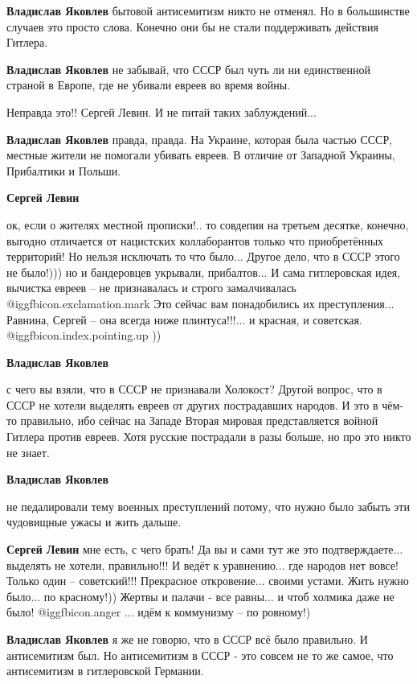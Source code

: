 \begin{itemize}
\begin{itemize}
\textbf{Владислав Яковлев} бытовой антисемитизм никто не отменял. Но в большинстве случаев это просто слова. Конечно они бы не стали поддерживать действия Гитлера.

\textbf{Владислав Яковлев} не забывай, что СССР был чуть ли ни единственной страной в Европе, где не убивали евреев во время войны.

Неправда это!! Сергей Левин. И не питай таких заблуждений...

\textbf{Владислав Яковлев} правда, правда. На Украине, которая была частью СССР, местные жители не помогали убивать евреев. В отличие от Западной Украины, Прибалтики и Польши.

\textbf{Сергей Левин} 

ок, если о жителях местной прописки!.. то совдепия на третьем десятке, конечно,
выгодно отличается от нацистских коллаборантов только что приобретённых
территорий! Но нельзя исключать то что было... Другое дело, что в СССР этого не
было!))) но и бандеровцев укрывали, прибалтов... И сама гитлеровская идея,
вычистка евреев – не признавалась и строго замалчивалась @igg{fbicon.exclamation.mark} Это сейчас вам
понадобились их преступления... Равнина, Сергей – она всегда ниже
плинтуса!!!... и красная, и советская. @igg{fbicon.index.pointing.up} ))

\textbf{Владислав Яковлев} 

с чего вы взяли, что в СССР не признавали Холокост? Другой вопрос, что в СССР
не хотели выделять евреев от других пострадавших народов. И это в чём-то
правильно, ибо сейчас на Западе Вторая мировая представляется войной Гитлера
против евреев. Хотя русские пострадали в разы больше, но про это никто не
знает.

\textbf{Владислав Яковлев} 

не педалировали тему военных преступлений потому, что нужно было забыть эти
чудовищные ужасы и жить дальше.

\textbf{Сергей Левин} мне есть, с чего брать! Да вы и сами тут же это подтверждаете... выделять не хотели, правильно!!! И ведёт к уравнению... где народов нет вовсе! Только один – советский!!! Прекрасное откровение... своими устами. Жить нужно было... по красному!)) Жертвы и палачи - все равны... и чтоб холмика даже не было! @igg{fbicon.anger} ... идём к коммунизму – по ровному!)

\textbf{Владислав Яковлев} я же не говорю, что в СССР всё было правильно. И антисемитизм был. Но антисемитизм в СССР - это совсем не то же самое, что антисемитизм в гитлеровской Германии.


\end{itemize}
\end{itemize}
